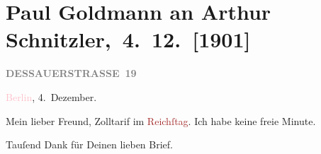 

\renewcommand{\erwaehntePersonen}{Personen: Leo Ebermann, Gerhart Hauptmann, Robert Hirschfeld, Moriz Neuda, Karl von Perfall}
\renewcommand{\erwaehnteInstitutionen}{Institutionen: Jung-Wiener Theater zum Lieben Augustin, Neue Freie Presse, Reichstag}
\renewcommand{\erwaehnteOrte}{Orte: Berlin, Dessauer Straße, Deutschland, Wien}
\renewcommand{\erwaehnteWerke}{Werke: Der rothe Hahn. Tragikomödie in vier Akten, Frankfurter Zeitung, Gerhart Hauptmanns Tragikomödie »Der rothe Hahn«, Hanneles Himmelfahrt. Traumdichtung in zwei Teilen, Hauptmanns Niedergang und die Berliner Litteratur-Tyrannei, Kölnische Zeitung, Lebendige Stunden. Vier Einakter, Michael Kramer. Drama, Theater- und Kunstnachrichten. Jung-Wiener-Theater »Zum lieben Augustin«, Wiener Leben}
\section[ Paul Goldmann an Arthur Schnitzler, 4. 12. {[}1901{]}]{Paul Goldmann an Arthur Schnitzler, 4. 12. {[}1901{]}}
\nopagebreak{}
\rehead{ }\normalsize\beginnumbering{}
\toendnotes[C]{\smallbreak\pagebreak[2]}
\toendnotes[C]{\smallbreak}
\pstart
           \noindent{}\raggedleft{}{\pb}\textcolor{pink}{\textcolor{gray}{\textbf{DESSAUERSTRASSE 19}}}{}\ledrightnote{\textcolor{pink}{Dessauer Straße}}\pend
           
\pstart
           \textcolor{pink}{Berlin}{}\ledrightnote{\textcolor{pink}{Berlin}}, 4. Dezember.\pend
           
\pstart\center{}Mein lieber Freund,\pend
\pstart
           Zolltarif im \textcolor{brown}{Reichſtag}{}\ledrightnote{\textcolor{brown}{Reichstag}}. Ich habe keine freie
               Minute.\pend
           
\pstart
           Tauſend Dank für Deinen lieben Brief.\pend
           
